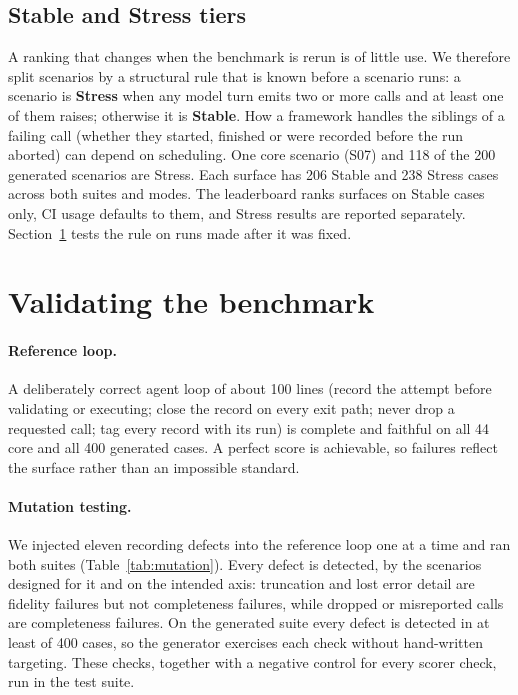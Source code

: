 \documentclass[10pt]{article}
\begin{document}
\subsection{Stable and Stress tiers}
\label{sec:tiers}
A ranking that changes when the benchmark is rerun is of little use. We therefore split scenarios by a structural rule that is known before a scenario runs: a scenario is \textbf{Stress} when any model turn emits two or more calls and at least one of them raises; otherwise it is \textbf{Stable}. How a framework handles the siblings of a failing call (whether they started, finished or were recorded before the run aborted) can depend on scheduling. One core scenario (S07) and 118 of the 200 generated scenarios are Stress. Each surface has 206 Stable and 238 Stress cases across both suites and modes. The leaderboard ranks surfaces on Stable cases only, CI usage defaults to them, and Stress results are reported separately. Section~\ref{sec:validation} tests the rule on runs made after it was fixed.

\section{Validating the benchmark}
\label{sec:validation}

\paragraph{Reference loop.} A deliberately correct agent loop of about 100 lines (record the attempt before validating or executing; close the record on every exit path; never drop a requested call; tag every record with its run) is complete and faithful on all 44 core and all 400 generated cases. A perfect score is achievable, so failures reflect the surface rather than an impossible standard.

\paragraph{Mutation testing.} We injected eleven recording defects into the reference loop one at a time and ran both suites (Table~\ref{tab:mutation}). Every defect is detected, by the scenarios designed for it and on the intended axis: truncation and lost error detail are fidelity failures but not completeness failures, while dropped or misreported calls are completeness failures. On the generated suite every defect is detected in at least \mutGenMin{} of 400 cases, so the generator exercises each check without hand-written targeting. These checks, together with a negative control for every scorer check, run in the test suite.
\end{document}
